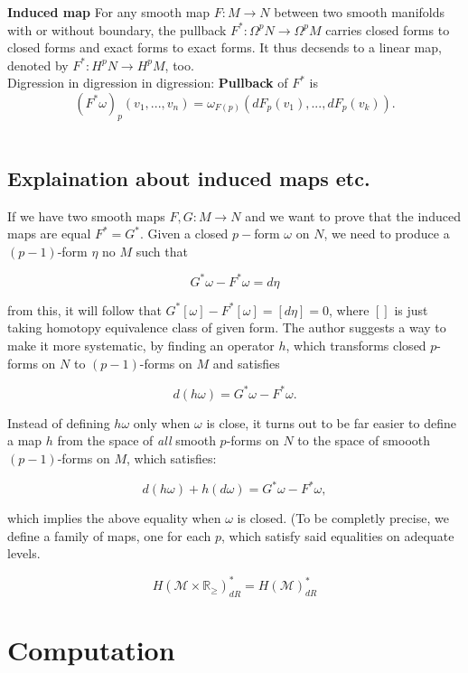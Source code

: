 \documentclass[licencjacka]{pracamgr}
\theoremstyle{definition}
\theoremstyle{definition}
\theoremstyle{plain}
\theoremstyle{plain}
\begin{document}
\textbf{Induced map} For any smooth map $F:
M \rightarrow N$ between two smooth manifolds with or without
boundary, the pullback $F^\ast: \Omega^p N \rightarrow \Omega^p M$
carries closed forms to closed forms and exact forms to exact
forms. It thus decsends to a linear map, denoted by $F^\ast: H^p N
\rightarrow H^p M$, too. \\

Digression in digression in digression: \textbf{Pullback} of $F^\ast$ is
\[
    (F^\ast \omega)_p(v_1, ..., v_n) =
        \omega_{F(p)}(dF_p(v_1), ..., dF_p(v_k)).
\] \\


\section{Explaination about induced maps etc.}

If we have two smooth maps $F, G:
M \rightarrow N$ and we want to prove that the induced maps are equal
$F^\ast = G^\ast$. Given a closed $p-$form $\omega$ on $N$, we need to
produce a $(p-1)$-form $\eta$ no $M$ such that

\[
    G^\ast \omega - F^\ast \omega = d\eta
\]

from this, it will follow that $ G^\ast [\omega] - F^\ast [\omega] =
[d\eta] = 0$, where $[]$ is just taking homotopy equivalence class
of given form. The author suggests a way to make it more systematic,
by finding an operator $h$, which transforms closed $p$-forms on $N$
to $(p-1)$-forms on $M$ and satisfies

\[
    d(h\omega) = G^\ast \omega - F^\ast \omega.
\]

Instead of defining $h\omega$ only when $\omega$ is close, it turns
out to be far easier to define a map $h$ from the space of
\textit{all} smooth $p$-forms on $N$ to the space of smoooth
$(p-1)$-forms on $M$, which satisfies:

\[
    d(h\omega) + h(d\omega) = G^\ast \omega - F^\ast \omega ,
\]

which implies the above equality when $\omega$ is closed. (To be
completly precise, we define a family of maps, one for each $p$, which
satisfy said equalities on adequate levels.

\[
    H(\mathcal{M} \times \mathbb{R}_{\geq})_{dR}^\ast = H(\mathcal{M})_{dR}^\ast
\]




\chapter{Computation}
\end{document}
